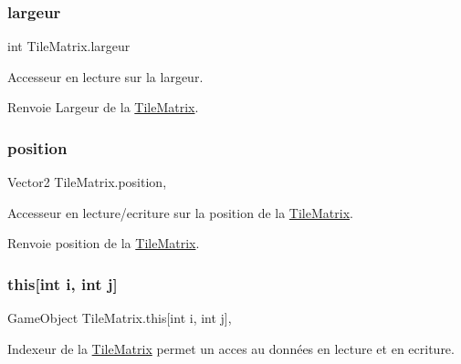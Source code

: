 \subsubsection{\texorpdfstring{largeur}{largeur}}
{\footnotesize\ttfamily int Tile\+Matrix.\+largeur\hspace{0.3cm}{\ttfamily [get]}}



Accesseur en lecture sur la largeur. 

\begin{DoxyReturn}{Renvoie}
Largeur de la \hyperlink{class_tile_matrix}{Tile\+Matrix}. 
\end{DoxyReturn}
\mbox{\label{class_tile_matrix_ac005af42acbdcf02179ba2514d20f59a}} 
\subsubsection{\texorpdfstring{position}{position}}
{\footnotesize\ttfamily Vector2 Tile\+Matrix.\+position\hspace{0.3cm}{\ttfamily [get]}, {\ttfamily [set]}}



Accesseur en lecture/ecriture sur la position de la \hyperlink{class_tile_matrix}{Tile\+Matrix}. 

\begin{DoxyReturn}{Renvoie}
position de la \hyperlink{class_tile_matrix}{Tile\+Matrix}. 
\end{DoxyReturn}
\mbox{\label{class_tile_matrix_a19ee238fde6e939b8d4eb6a23fd78563}} 
\subsubsection{\texorpdfstring{this[int i, int j]}{this[int i, int j]}}
{\footnotesize\ttfamily Game\+Object Tile\+Matrix.\+this\mbox{[}int i, int j\mbox{]}\hspace{0.3cm}{\ttfamily [get]}, {\ttfamily [set]}}



Indexeur de la \hyperlink{class_tile_matrix}{Tile\+Matrix} permet un acces au données en lecture et en ecriture. 


